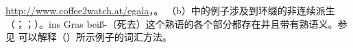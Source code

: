 \begin{exe}
\begin{xlist}[iv.]
\begin{exe}
\begin{xlist}[iv.]
{\url{http://www.coffee2watch.at/egala}，。
}
\zl
（b）中的例子涉及到环缀\gee 的非连续派生（\citealp[\S~3.4.3]{Luedeling2001a}；\citealp[--327, 372--377]{Mueller2002b}；\citealp[\S~2.2.1, \S~5.2.1]{Mueller2003a}）。ins Gras beiß-（死去）这个熟语的各个部分都存在并且带有熟语义。参见 可以解释（）所示例子的词汇方法。





\end{xlist}
\end{exe}
\end{xlist}
\end{exe}
